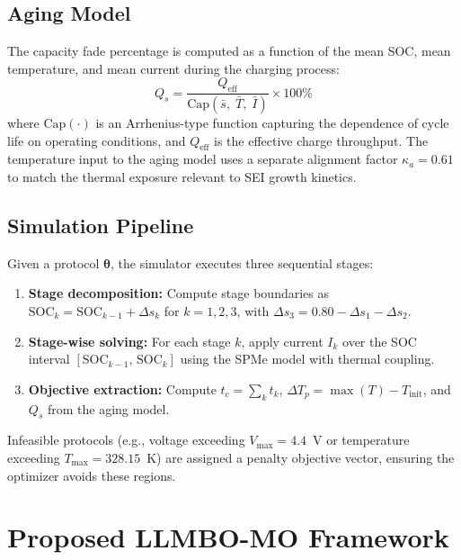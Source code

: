 \documentclass[journal]{IEEEtran}
\newcommand{\btheta}{\boldsymbol{\theta}}
\begin{document}
\subsection{Aging Model}

The capacity fade percentage is computed as a function of the mean SOC, mean temperature, and mean current during the charging process:
\begin{equation}
Q_s = \frac{Q_{\text{eff}}}{\text{Cap}(\bar{s},\; \bar{T},\; \bar{I})} \times 100\%
\label{eq:aging}
\end{equation}
where $\text{Cap}(\cdot)$ is an Arrhenius-type function capturing the dependence of cycle life on operating conditions, and $Q_{\text{eff}}$ is the effective charge throughput. The temperature input to the aging model uses a separate alignment factor $\kappa_a = 0.61$ to match the thermal exposure relevant to SEI growth kinetics.

\subsection{Simulation Pipeline}

Given a protocol $\btheta$, the simulator executes three sequential stages:
\begin{enumerate}
\item \textbf{Stage decomposition:} Compute stage boundaries as $\text{SOC}_k = \text{SOC}_{k-1} + \Delta s_k$ for $k=1,2,3$, with $\Delta s_3 = 0.80 - \Delta s_1 - \Delta s_2$.
\item \textbf{Stage-wise solving:} For each stage $k$, apply current $I_k$ over the SOC interval $[\text{SOC}_{k-1},\, \text{SOC}_k]$ using the SPMe model with thermal coupling.
\item \textbf{Objective extraction:} Compute $t_c = \sum_k t_k$, $\Delta T_p = \max(T) - T_{\text{init}}$, and $Q_s$ from the aging model.
\end{enumerate}
Infeasible protocols (e.g., voltage exceeding $V_{\max} = 4.4$~V or temperature exceeding $T_{\max} = 328.15$~K) are assigned a penalty objective vector, ensuring the optimizer avoids these regions.

\section{Proposed LLMBO-MO Framework}
\label{sec:method}
\end{document}
